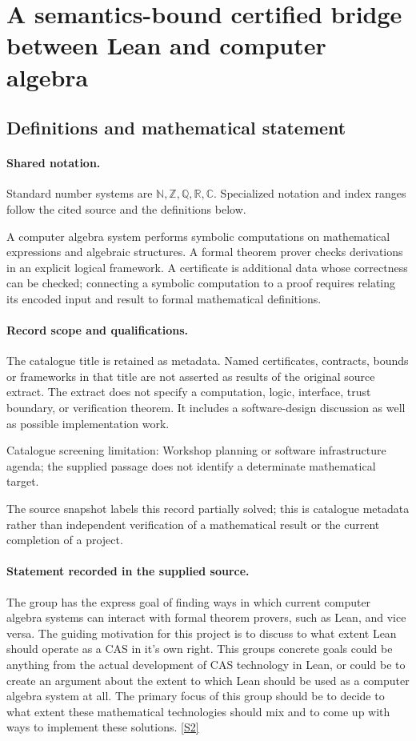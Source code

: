 \documentclass[11pt]{article}
\newcommand{\sref}[2]{\hyperlink{source:#1:#2}{[S#2]}}
\begin{document}
\section{A semantics-bound certified bridge between Lean and computer algebra}\label{statement}

\subsection{Definitions and mathematical statement}

\paragraph{Shared notation.}Standard number systems are $\mathbb N,\mathbb Z,\mathbb Q,\mathbb R,\mathbb C$. Specialized notation and index ranges follow the cited source and the definitions below.


A computer algebra system performs symbolic computations on mathematical expressions and algebraic structures. A formal theorem prover checks derivations in an explicit logical framework. A certificate is additional data whose correctness can be checked; connecting a symbolic computation to a proof requires relating its encoded input and result to formal mathematical definitions.
\paragraph{Record scope and qualifications.}
The catalogue title is retained as metadata. Named certificates, contracts, bounds or frameworks in that title are not asserted as results of the original source extract.
The extract does not specify a computation, logic, interface, trust boundary, or verification theorem. It includes a software-design discussion as well as possible implementation work.

Catalogue screening limitation: Workshop planning or software infrastructure agenda; the supplied passage does not identify a determinate mathematical target.

The source snapshot labels this record partially solved; this is catalogue metadata rather than independent verification of a mathematical result or the current completion of a project.
\paragraph{Statement recorded in the supplied source.}
The group has the express goal of finding ways in which current computer algebra systems can interact with formal theorem provers, such as Lean, and vice versa. The guiding motivation for this project is to discuss to what extent Lean should operate as a CAS in it's own right. This groups concrete goals could be anything from the actual development of CAS technology in Lean, or could be to create an argument about the extent to which Lean should be used as a computer algebra system at all.
The primary focus of this group should be to decide to what extent these mathematical technologies should mix and to come up with ways to implement these solutions. \sref{statement}{2}
\end{document}
